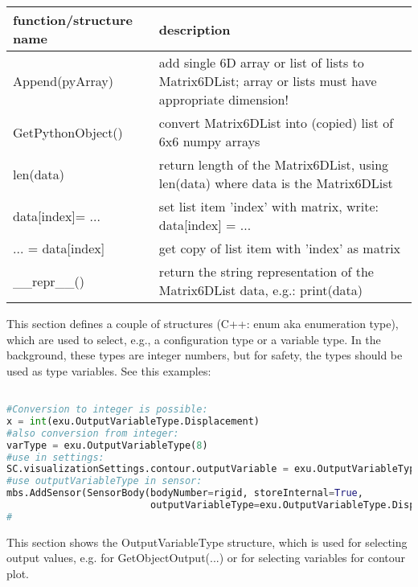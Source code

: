 \begin{center}
\footnotesize
\begin{longtable}{| p{8cm} | p{8cm} |} 
\hline
{\bf function/structure name} & {\bf description}\\ \hline
  Append(pyArray) & add single 6D array or list of lists to Matrix6DList; array or lists must have appropriate dimension!\\ \hline 
  GetPythonObject() & convert Matrix6DList into (copied) list of 6x6 numpy arrays\\ \hline 
  len(data) & return length of the Matrix6DList, using len(data) where data is the Matrix6DList\\ \hline 
  data[index]= ... & set list item 'index' with matrix, write: data[index] = ...\\ \hline 
  ... = data[index] & get copy of list item with 'index' as matrix\\ \hline 
  \_\_repr\_\_() & return the string representation of the Matrix6DList data, e.g.: print(data)\\ \hline 
\end{longtable}
\end{center}

\label{sec:cinterface:typedef}
This section defines a couple of structures (C++: enum aka enumeration type), which are used to select, e.g., a configuration type or a variable type. In the background, these types are integer numbers, but for safety, the types should be used as type variables. See this examples:

\pythonstyle
\begin{lstlisting}[language=Python, firstnumber=1]

#Conversion to integer is possible: 
x = int(exu.OutputVariableType.Displacement)
#also conversion from integer: 
varType = exu.OutputVariableType(8)
#use in settings:
SC.visualizationSettings.contour.outputVariable = exu.OutputVariableType.StressLocal
#use outputVariableType in sensor:
mbs.AddSensor(SensorBody(bodyNumber=rigid, storeInternal=True,
                         outputVariableType=exu.OutputVariableType.Displacement))
#
\end{lstlisting}


\label{sec:OutputVariableType}
This section shows the OutputVariableType structure, which is used for selecting output values, e.g. for GetObjectOutput(...) or for selecting variables for contour plot.

